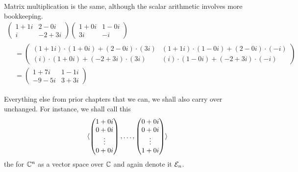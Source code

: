 \begin{example}
Matrix multiplication is the same, although the scalar arithmetic involves more
bookkeeping.
\begin{multline*}
  \begin{pmatrix}
     1+1i  &2-0i  \\
      i    &-2+3i
  \end{pmatrix}
  \begin{pmatrix}
     1+0i  &1-0i  \\
     3i    &-i
  \end{pmatrix}             \\
 \begin{aligned}
  &=\begin{pmatrix}
     (1+1i)\cdot(1+0i)+(2-0i)\cdot(3i)   &(1+1i)\cdot(1-0i)+(2-0i)\cdot(-i) \\
     (i)\cdot(1+0i)+(-2+3i)\cdot(3i)     &(i)\cdot(1-0i)+(-2+3i)\cdot(-i)
  \end{pmatrix}                                                  \\
  &=\begin{pmatrix}
     1+7i  &1-1i  \\
    -9-5i  &3+3i
  \end{pmatrix}
 \end{aligned}
\end{multline*}
\end{example}

Everything else from prior chapters that we can, 
we shall also carry over unchanged.
For instance, we shall call this
\begin{equation*}
   \langle\begin{pmatrix} 1+0i \\ 0+0i \\ \vdots \\ 0+0i \end{pmatrix},
             \dots,
             \begin{pmatrix} 0+0i \\ 0+0i \\ \vdots \\ 1+0i \end{pmatrix}\rangle
\end{equation*}
the %
for \( \mathbb{C}^n \) as a vector space over $\mathbb{C}$
and again denote it \( {\cal E}_n \).











































